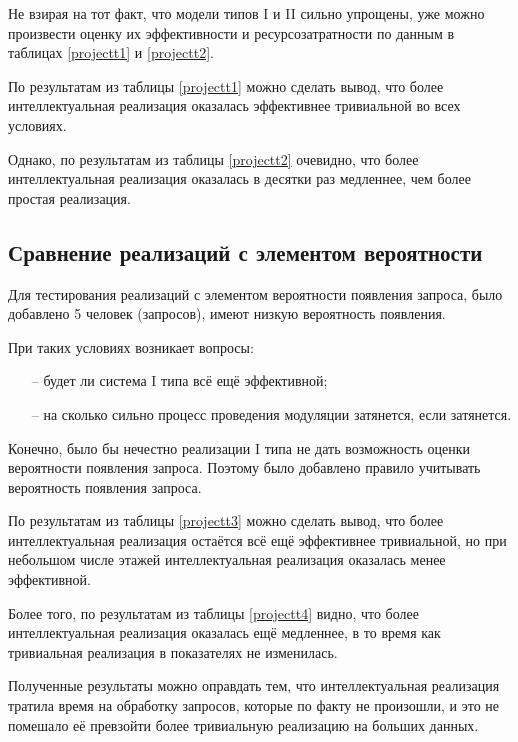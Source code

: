 		Не взирая на тот факт, что модели типов I и II сильно упрощены, уже можно произвести оценку их
			эффективности и ресурсозатратности  по данным в таблицах \ref{projectt1}  и \ref{projectt2}.
		
		

			По результатам из таблицы \ref{projectt1}  можно сделать вывод, что более интеллектуальная реализация
				оказалась эффективнее тривиальной во всех условиях.

		
			
			Однако, по результатам из таблицы \ref{projectt2}  очевидно, что более интеллектуальная реализация
				оказалась в десятки раз медленнее, чем более простая реализация.

	\subsection{Сравнение реализаций с элементом вероятности}
		
		Для тестирования реализаций с элементом вероятности появления запроса, было добавлено 5 человек (запросов),
			имеют низкую вероятность появления.

		При таких условиях возникает вопросы:
		\begin{itemize}
			\item[--] будет ли система  I типа всё ещё эффективной;
			\item[--] на сколько сильно процесс проведения модуляции затянется, если затянется.
		\end{itemize}

		Конечно, было бы нечестно реализации I типа не дать возможность оценки вероятности появления запроса.
			Поэтому было добавлено правило учитывать вероятность появления запроса.

		

		По результатам из таблицы \ref{projectt3}  можно сделать вывод, что более интеллектуальная реализация
			остаётся всё ещё эффективнее тривиальной, но  при небольшом числе этажей интеллектуальная реализация
			оказалась менее эффективной.

		

		Более того, по результатам из таблицы \ref{projectt4}  видно, что более интеллектуальная реализация
			оказалась ещё медленнее, в то время как тривиальная реализация в показателях не изменилась.


		Полученные результаты можно оправдать тем, что интеллектуальная реализация тратила время на обработку
			запросов, которые по факту не произошли, и это не помешало её превзойти более тривиальную реализацию
			на больших данных.

